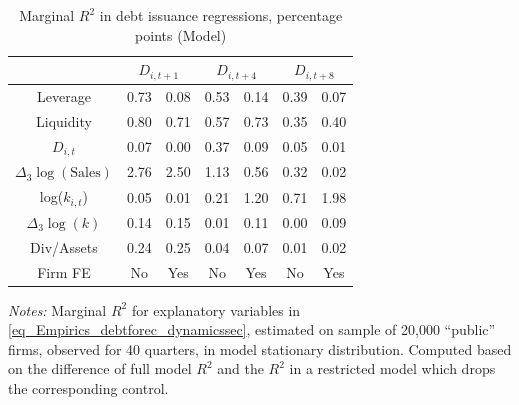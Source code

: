 \begin{table}[ht]
\centering
\caption{Marginal $R^{2}$ in debt issuance regressions, percentage points (Model)} 
\label{mod_tab:mr2_data}
\begin{tabular}{ccccccc}
  \hline \hline 
 & \multicolumn{2}{c}{$D_{i,t+1}$} & \multicolumn{2}{c}{$D_{i,t+4}$} & \multicolumn{2}{c}{$D_{i,t+8}$} \\ 
 \hline
  \hline
Leverage & 0.73 & 0.08 & 0.53 & 0.14 & 0.39 & 0.07 \\ 
  Liquidity & 0.80 & 0.71 & 0.57 & 0.73 & 0.35 & 0.40 \\ 
  $D_{i,t}$ & 0.07 & 0.00 & 0.37 & 0.09 & 0.05 & 0.01 \\ 
  $\Delta_{3} \log(\text{Sales})$ & 2.76 & 2.50 & 1.13 & 0.56 & 0.32 & 0.02 \\ 
  log($k_{i,t}$) & 0.05 & 0.01 & 0.21 & 1.20 & 0.71 & 1.98 \\ 
  $\Delta_{3} \log(k)$ & 0.14 & 0.15 & 0.01 & 0.11 & 0.00 & 0.09 \\ 
  Div/Assets & 0.24 & 0.25 & 0.04 & 0.07 & 0.01 & 0.02 \\ 
   \hline Firm FE & \multicolumn{1}{c}{No} & \multicolumn{1}{c}{Yes} & \multicolumn{1}{c}{No} & \multicolumn{1}{c}{Yes} & \multicolumn{1}{c}{No} & \multicolumn{1}{c}{Yes} \\ 
\hline 
 \hline
\end{tabular}

\vspace{4pt}
\begin{minipage}{\textwidth}
{\footnotesize \emph{Notes:} Marginal $R^{2}$ for explanatory variables in \eqref{eq_Empirics_debtforec_dynamicssec}, estimated on sample of 20,000 ``public'' firms, observed for 40 quarters, in model stationary distribution.
Computed based on the difference of full model $R^{2}$ and the $R^{2}$ in a restricted model which drops the corresponding control.
}
\end{minipage}

\end{table}

